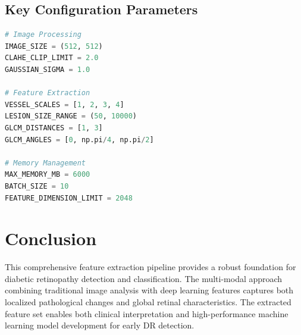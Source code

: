 \documentclass[11pt]{article}
\begin{document}
\subsection{Key Configuration Parameters}
\begin{lstlisting}[language=Python, caption=Configuration Parameters]
# Image Processing
IMAGE_SIZE = (512, 512)
CLAHE_CLIP_LIMIT = 2.0
GAUSSIAN_SIGMA = 1.0

# Feature Extraction
VESSEL_SCALES = [1, 2, 3, 4]
LESION_SIZE_RANGE = (50, 10000)
GLCM_DISTANCES = [1, 3]
GLCM_ANGLES = [0, np.pi/4, np.pi/2]

# Memory Management
MAX_MEMORY_MB = 6000
BATCH_SIZE = 10
FEATURE_DIMENSION_LIMIT = 2048
\end{lstlisting}

\section{Conclusion}

This comprehensive feature extraction pipeline provides a robust foundation for diabetic retinopathy detection and classification. The multi-modal approach combining traditional image analysis with deep learning features captures both localized pathological changes and global retinal characteristics. The extracted feature set enables both clinical interpretation and high-performance machine learning model development for early DR detection.
\end{document}

